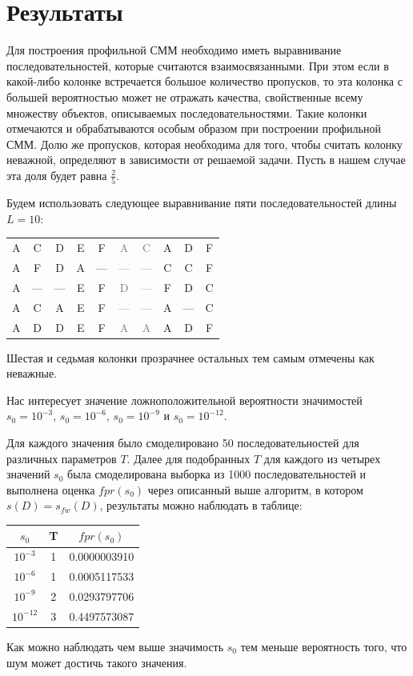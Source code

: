 \documentclass[]{article}
\begin{document}
			\section{Результаты}
			Для построения профильной СММ необходимо иметь выравнивание последовательностей, которые считаются взаимосвязанными. При этом если в какой-либо колонке встречается большое количество пропусков, то эта колонка с большей вероятностью может не отражать качества, свойственные всему множеству объектов, описываемых последовательностями. Такие колонки отмечаются и обрабатываются особым образом при построении профильной СММ. Долю же пропусков, которая необходима для того, чтобы считать колонку неважной, определяют в зависимости от решаемой задачи. Пусть в нашем случае эта доля будет равна $\frac{2}{5}$.
			
			Будем использовать следующее выравнивание пяти последовательностей длины $L=10$:
			\begin{center}
				\begin{tabular}{cccccccccc}
					A&C&D&E&F&\textcolor{gray}{A}&\textcolor{gray}{C}&A&D&F\\
					A&F&D&A&—&\textcolor{gray}{—}&\textcolor{gray}{—}&C&C&F\\
					A&—&—&E&F&\textcolor{gray}{D}&\textcolor{gray}{—}&F&D&C\\
					A&C&A&E&F&\textcolor{gray}{—}&\textcolor{gray}{—}&A&—&C\\
					A&D&D&E&F&\textcolor{gray}{A}&\textcolor{gray}{A}&A&D&F
				\end{tabular}
			\end{center}
			Шестая и седьмая колонки прозрачнее остальных тем самым отмечены как неважные.
			
			Нас интересует значение ложноположительной вероятности значимостей $s_{0}=10^{-3}$, $s_{0}=10^{-6}$, $s_{0}=10^{-9}$ и $s_{0}=10^{-12}$.
			
			Для каждого значения было смоделировано 50 последовательностей для различных параметров $T$. Далее для подобранных $T$ для каждого из четырех значений $s_{0}$ была смоделирована выборка из 1000 последовательностей и выполнена оценка $fpr(s_{0})$ через описанный выше алгоритм, в котором $s(D) = s_{fw}(D)$, результаты можно наблюдать в таблице:
			\begin{center}
				\begin{tabular}{ccc}
					$s_{0}$&T&$fpr(s_{0})$\\ \hline
					$10^{-3}$&1&0.0000003910 \\
					$10^{-6}$&1&0.0005117533 \\
					$10^{-9}$&2&0.0293797706 \\
					$10^{-12}$&3&0.4497573087 \\					
				\end{tabular}
			\end{center}
			Как можно наблюдать чем выше значимость $s_{0}$ тем меньше вероятность того, что шум может достичь такого значения.
			


				
				
				
				
\end{document}
